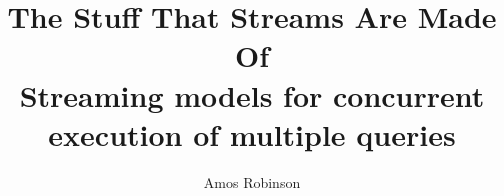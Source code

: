 \thispagestyle{empty}
\title{
  {The Stuff That Streams Are Made Of} \\
  {\Large Streaming models for concurrent execution of multiple queries} \\
  }

\author{Amos Robinson}

\maketitle
